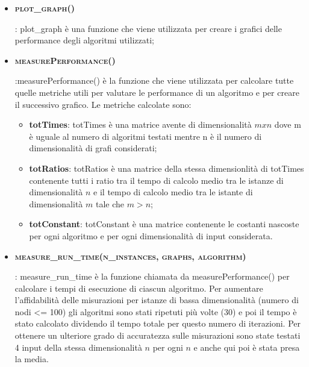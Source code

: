 \begin{itemize}
    \item \hypertarget{plotgrafi}{\textbf{\textsc{plot\_graph()}}}: plot\_graph è una funzione che viene utilizzata per creare i grafici delle performance degli algoritmi utilizzati;
    
    \item \hypertarget{measureperformance}{\textbf{\textsc{measurePerformance()}}}:measurePerformance() è la funzione che viene utilizzata per calcolare tutte quelle metriche utili per valutare le performance di un algoritmo e per creare il successivo grafico. Le metriche calcolate sono:
   
    \begin{itemize}
        
        \item  \textbf{totTimes}: totTimes è una matrice avente di dimensionalità $mxn$ dove m è uguale al numero di algoritmi testati mentre n è il numero di dimensionalità di grafi considerati;
        
        \item\textbf{totRatios}: totRatios è una matrice della stessa dimensionlità di totTimes contenente tutti i ratio tra il tempo di calcolo medio tra le istanze di dimensionalità $n$ e il tempo di calcolo medio tra le istante di dimensionalità $m$ tale che $m>n$;
        
        \item  \textbf{totConstant}: totConstant è una matrice contenente le costanti nascoste per ogni algoritmo e per ogni dimensionalità di input considerata.
    \end{itemize}
    
    \item \hypertarget{measureruntime}{\textbf{\textsc{measure\_run\_time(n\_instances, graphs, algorithm)}}}: measure\_run\_time è la funzione chiamata da  measurePerformance() per calcolare i tempi di esecuzione di ciascun algoritmo. Per aumentare l'affidabilità delle misurazioni per istanze di bassa dimensionalità (numero di nodi <= 100) gli algoritmi sono stati ripetuti più volte (30) e poi il tempo è stato calcolato dividendo il tempo totale per questo numero di iterazioni. Per ottenere un ulteriore grado di accuratezza sulle misurazioni sono state testati 4 input della stessa dimensionalità $n$ per ogni $n$ e anche qui poi è stata presa la media.
\end{itemize}


\newpage